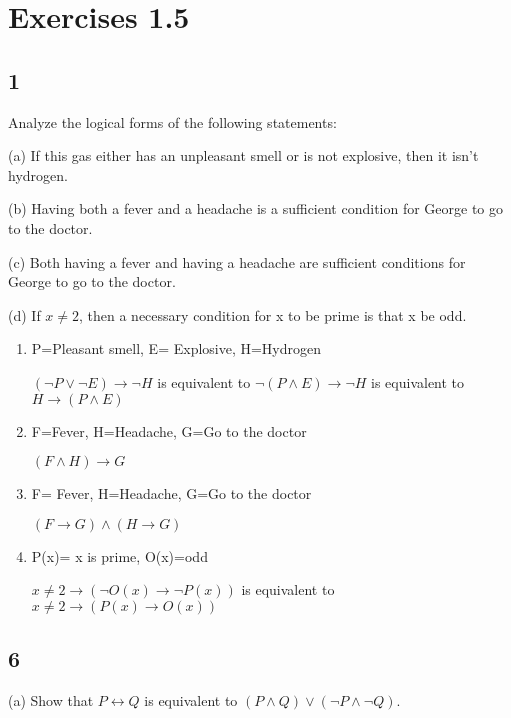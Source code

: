 \documentclass{article}
\begin{document}
\section{Exercises 1.5}
\subsection{1}
Analyze the logical forms of the following statements:

(a) If this gas either has an unpleasant smell or is not explosive, then it
isn’t hydrogen.

(b) Having both a fever and a headache is a sufficient condition for
George to go to the doctor.

(c) Both having a fever and having a headache are sufficient conditions
for George to go to the doctor.

(d) If $x \neq 2$, then a necessary condition for x to be prime is that x be odd.
\begin{enumerate}[label=(\alph*)]
    \item 
    P=Pleasant smell, E= Explosive, H=Hydrogen
    
    $(\neg P \lor \neg E)\rightarrow \neg H$ 
    is equivalent to $\neg (P \land E) \rightarrow \neg H$ is equivalent to $H \rightarrow (P \land E)$
    \item
    F=Fever, H=Headache, G=Go to the doctor
    
    $(F\land H)\rightarrow G$
    \item
    F= Fever, H=Headache, G=Go to the doctor
    
    $(F\rightarrow G) \land (H\rightarrow G)$
    \item
    P(x)= x is prime, O(x)=odd
    
    $x \neq 2 \rightarrow( \neg O(x) \rightarrow \neg P(x))$ is equivalent to $x \neq 2 \rightarrow( P(x) \rightarrow O(x))$
\end{enumerate}
\subsection{6}
(a) Show that $P \leftrightarrow Q$ is equivalent to $(P \land Q) \lor (\neg P \land \neg Q)$.
\end{document}
